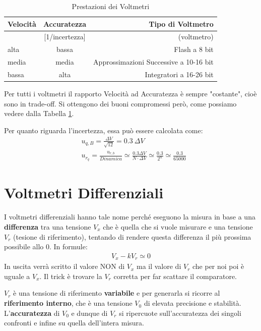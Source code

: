 \documentclass[a4paper,11pt]{report}
\begin{document}
\begin{table}[H]
  \caption{Prestazioni dei Voltmetri}
  \label{tab:voltmetri}

  \begin{center}
    \begin{tabular}{|l|c|r|}
    \hline
    \textbf{Velocità } &\textbf{Accuratezza} &\textbf{Tipo di Voltmetro} \\
    \hline
    [letture/s] & [1/incertezza]  &  (voltmetro) \\
    \hline  
       alta   &  bassa  & Flash a 8 bit \\
    \hline
       media  &  media  & Approssimazioni Successive a 10-16 bit \\
    \hline
       bassa  &  alta   & Integratori a 16-26 bit \\
    \hline
    \end{tabular}
  \end{center}
\end{table}

Per tutti i voltmetri il rapporto Velocità ad Accuratezza è sempre "costante", cioè sono in trade-off. Si ottengono dei buoni compromessi però, come possiamo vedere dalla Tabella \ref{tab:voltmetri}.

Per quanto riguarda l'incertezza, essa può essere calcolata come: 
\begin{align*}  
  &u_{q,B} = \frac{\Delta V}{\sqrt{12} } = 0.3~\Delta V \\
  &u_{r_q} = \frac{u_{r,b}}{Dinamica} \simeq \frac{0.3 \Delta V}{N \cdot \Delta V} \simeq \frac{0.3}{2^n} \simeq \frac{0.3}{65000}
\end{align*}
\section{Voltmetri Differenziali}
I voltmetri differenziali hanno tale nome perché eseguono la misura in base a una \textbf{differenza} tra una tensione $ V_x $ che è quella che si vuole misurare e una tensione $ V_r $ (tesione di riferimento), tentando di rendere questa differenza il più prossima possibile allo 0. In formule:
\begin{align*}
  V_x - kV_r \simeq 0
\end{align*}
In uscita verrà scritto il valore NON di $ V_x $ ma il valore di $ V_r $ che per noi poi è uguale a $ V_x $. Il trick è trovare la $ V_r $ corretta per far scattare il comparatore.

$ V_r $ è una tensione di riferimento \textbf{variabile} e per generarla si ricorre al \textbf{riferimento interno}, che è una tensione $ V_0 $ di elevata precisione e stabilità. L'\textbf{accuratezza} di $ V_0 $ e dunque di $ V_r $ si ripercuote sull'accuratezza dei singoli confronti e infine su quella dell'intera misura.
\end{document}
